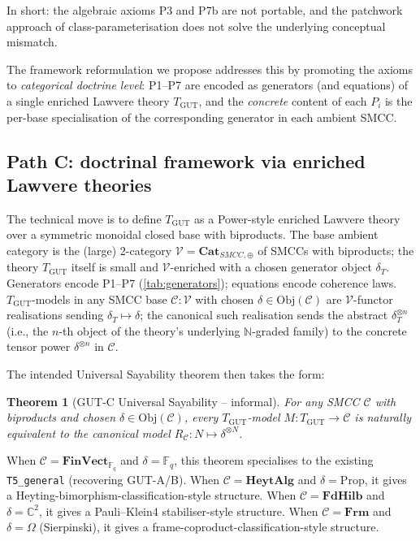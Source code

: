 \documentclass[11pt,a4paper]{article}
\theoremstyle{plain}
\newtheorem{theorem}{Theorem}[section]
\theoremstyle{definition}
\theoremstyle{remark}
\newcommand{\F}{\mathbb{F}}
\newcommand{\N}{\mathbb{N}}
\newcommand{\C}{\mathbb{C}}
\newcommand{\cat}[1]{\mathbf{#1}}
\newcommand{\HeytAlg}{\cat{HeytAlg}}
\newcommand{\FdHilb}{\cat{FdHilb}}
\newcommand{\Frm}{\cat{Frm}}
\newcommand{\FinVect}{\cat{FinVect}}
\newcommand{\Ob}{\mathrm{Obj}}
\newcommand{\TGUT}{T_{\mathrm{GUT}}}
\newcommand{\smcc}{SMCC}
\begin{document}
In short: the algebraic axioms P3 and P7b are not portable, and the patchwork approach of class-parameterisation does not solve the underlying conceptual mismatch.

The framework reformulation we propose addresses this by promoting the axioms to \emph{categorical doctrine level}: P1--P7 are encoded as generators (and equations) of a single enriched Lawvere theory $\TGUT$, and the \emph{concrete} content of each $P_i$ is the per-base specialisation of the corresponding generator in each ambient \smcc.

\subsection{Path C: doctrinal framework via enriched Lawvere theories}\label{sec:intro:path-c}

The technical move is to define $\TGUT$ as a Power-style enriched Lawvere theory~\cite{Pow99} over a symmetric monoidal closed base with biproducts. The base ambient category is the (large) 2-category $\mathcal{V} = \cat{Cat}_{\smcc,\oplus}$ of \smcc{}s with biproducts; the theory $\TGUT$ itself is small and $\mathcal{V}$-enriched with a chosen generator object $\delta_T$. Generators encode P1--P7 (\cref{tab:generators}); equations encode coherence laws. $\TGUT$-models in any \smcc{} base $\mathcal{C}:\mathcal{V}$ with chosen $\delta\in\Ob(\mathcal{C})$ are $\mathcal{V}$-functor realisations sending $\delta_T \mapsto \delta$; the canonical such realisation sends the abstract $\delta_T^{\otimes n}$ (i.e., the $n$-th object of the theory's underlying $\N$-graded family) to the concrete tensor power $\delta^{\otimes n}$ in $\mathcal{C}$.

The intended Universal Sayability theorem then takes the form:

\begin{theorem}[GUT-C Universal Sayability -- informal]\label{thm:us-informal}
For any \smcc{} $\mathcal{C}$ with biproducts and chosen $\delta\in\Ob(\mathcal{C})$, every $\TGUT$-model $M : \TGUT \to \mathcal{C}$ is naturally equivalent to the canonical model $R_{\mathcal{C}} : N \mapsto \delta^{\otimes N}$.
\end{theorem}

When $\mathcal{C} = \FinVect_{\F_q}$ and $\delta = \F_q$, this theorem specialises to the existing \texttt{T5\_general} (recovering GUT-A/B). When $\mathcal{C} = \HeytAlg$ and $\delta = \mathrm{Prop}$, it gives a Heyting-bimorphism-classification-style structure. When $\mathcal{C} = \FdHilb$ and $\delta = \C^2$, it gives a Pauli--Klein4 stabiliser-style structure. When $\mathcal{C} = \Frm$ and $\delta = \Omega$ (Sierpinski), it gives a frame-coproduct-classification-style structure.
\end{document}
